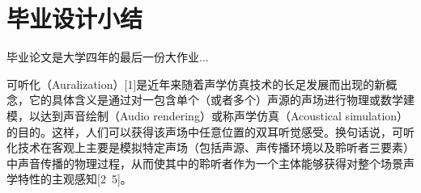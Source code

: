 \chapter*{毕业设计小结}

毕业论文是大学四年的最后一份大作业...


可听化（Auralization）[1]是近年来随着声学仿真技术的长足发展而出现的新概念，它的具体含义是通过对一包含单个（或者多个）声源的声场进行物理或数学建模，以达到声音绘制（Audio rendering）或称声学仿真（Acoustical simulation）的目的。这样，人们可以获得该声场中任意位置的双耳听觉感受。换句话说，可听化技术在客观上主要是模拟特定声场（包括声源、声传播环境以及聆听者三要素）中声音传播的物理过程，从而使其中的聆听者作为一个主体能够获得对整个场景声学特性的主观感知[2~5]。


\clearpage
\endinput